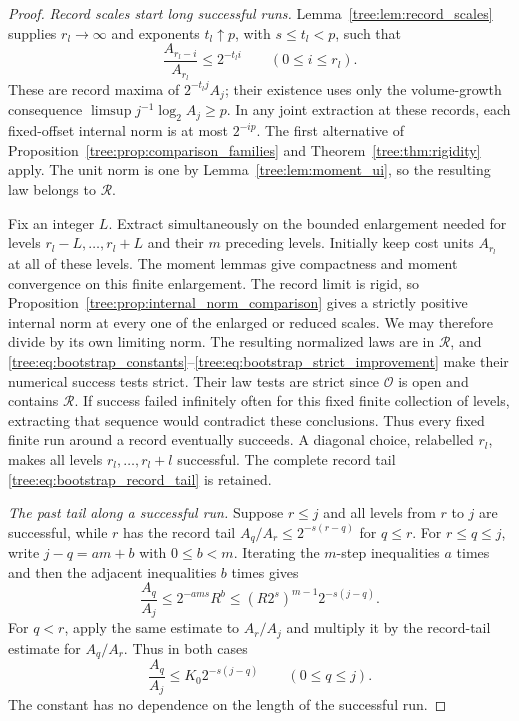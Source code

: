 \begin{proof}
\smallskip\noindent\emph{Record scales start long successful runs.}
Lemma~\ref{tree:lem:record_scales} supplies $r_l\to\infty$ and
exponents $t_l\uparrow p$, with $s\leq t_l<p$, such that
\begin{equation}
 \frac{A_{r_l-i}}{A_{r_l}}\leq2^{-t_li}
 \qquad(0\leq i\leq r_l).
 \label{tree:eq:bootstrap_record_tail}
\end{equation}
These are record maxima of $2^{-t_lj}A_j$; their existence
uses only the volume-growth consequence
$\limsup j^{-1}\log_2 A_j\geq p$.
In any joint extraction at these records, each fixed-offset
internal norm is at most $2^{-ip}$.  The first alternative of
Proposition~\ref{tree:prop:comparison_families} and
Theorem~\ref{tree:thm:rigidity} apply.  The unit norm is one by
Lemma~\ref{tree:lem:moment_ui}, so the resulting law belongs to
$\mathcal R$.

Fix an integer $L$.  Extract simultaneously on the bounded
enlargement needed for levels $r_l-L,\ldots,r_l+L$ and their
$m$ preceding levels.  Initially keep cost units $A_{r_l}$
at all of these levels.  The moment lemmas give compactness
and moment convergence on this finite enlargement.  The
record limit is rigid, so
Proposition~\ref{tree:prop:internal_norm_comparison} gives a
strictly positive internal norm at every one of the enlarged
or reduced scales.  We may therefore divide by its own
limiting norm.  The resulting normalized laws are in
$\mathcal R$, and \eqref{tree:eq:bootstrap_constants}--\eqref{tree:eq:bootstrap_strict_improvement}
make their numerical success tests strict.  Their law tests
are strict since $\mathcal O$ is open and contains
$\mathcal R$.  If success failed infinitely often for this
fixed finite collection of levels, extracting that sequence
would contradict these conclusions.  Thus every fixed
finite run around a record eventually succeeds.  A diagonal
choice, relabelled $r_l$, makes all levels
$r_l,\ldots,r_l+l$ successful.  The complete record tail
\eqref{tree:eq:bootstrap_record_tail} is retained.

\smallskip\noindent\emph{The past tail along a successful run.}
Suppose $r\leq j$ and all levels from $r$ to $j$ are
successful, while $r$ has the record tail
$A_q/A_r\leq2^{-s(r-q)}$ for $q\leq r$.
For $r\leq q\leq j$, write $j-q=am+b$ with
$0\leq b<m$.  Iterating the $m$-step inequalities $a$
times and then the adjacent inequalities $b$ times gives
\[
 \frac{A_q}{A_j}\leq 2^{-ams}R^b
 \leq(R2^s)^{m-1}2^{-s(j-q)}.
\]
For $q<r$, apply the same estimate to $A_r/A_j$ and
multiply it by the record-tail estimate for $A_q/A_r$.
Thus in both cases
\begin{equation}
 \frac{A_q}{A_j}\leq K_0 2^{-s(j-q)}
 \qquad(0\leq q\leq j).
 \label{tree:eq:bootstrap_prefailure_bound}
\end{equation}
The constant has no dependence on the length of the
successful run.


\end{proof}
